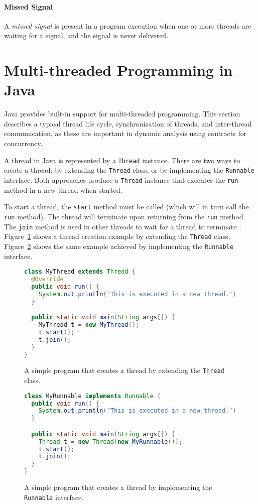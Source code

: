 \paragraph{Missed Signal}
A \emph{missed signal} is present in a program execution when one or more
threads are waiting for a signal, and the signal is never delivered.

\section{Multi-threaded Programming in Java}

Java provides built-in support for multi-threaded programming. This section
describes a typical thread life cycle, synchronization of threads, and
inter-thread communication, as these are important in dynamic analysis using
contracts for concurrency.

A thread in Java is represented by a \texttt{Thread} instance. There are two
ways to create a thread: by extending the \texttt{Thread} class, or by
implementing the \texttt{Runnable} interface. Both approaches produce a
\texttt{Thread} instance that executes the \texttt{run} method in a new thread
when started.

To start a thread, the \texttt{start} method must be called (which will in
turn call the \texttt{run} method). The thread will terminate upon returning
from the \texttt{run} method. The \texttt{join} method is used in other
threads to wait for a thread to terminate \cite{javaTheCompleteReference}.
Figure~\ref{threadExtend} shows a thread creation example by extending the
\texttt{Thread} class, Figure~\ref{threadRunnable} shows the same example
achieved by implementing the \texttt{Runnable} interface.

\begin{figure}[hbt]
    \label{threadExtend}
\begin{lstlisting}[language=java]
class MyThread extends Thread {
  @Override
  public void run() {
    System.out.println("This is executed in a new thread.");
  }

  public static void main(String args[]) {
    MyThread t = new MyThread();
    t.start();
    t.join();
  }
}
\end{lstlisting}
    \caption{A simple program that creates a thread by extending the
    \texttt{Thread} class.}
\end{figure}

\begin{figure}[hbt]
    \label{threadRunnable}
\begin{lstlisting}[language=java]
class MyRunnable implements Runnable {
  public void run() {
    System.out.println("This is executed in a new thread.");
  }

  public static void main(String args[]) {
    Thread t = new Thread(new MyRunnable());
    t.start();
    t.join();
  }
}
\end{lstlisting}
    \caption{A simple program that creates a thread by implementing the
    \texttt{Runnable} interface.}
\end{figure}

